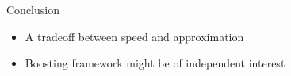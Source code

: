 \begin{frame}{Conclusion}
    \begin{itemize}[<+(1)>]
        \item A tradeoff between speed and approximation
        \item Boosting framework might be of independent interest
    \end{itemize}
\end{frame}